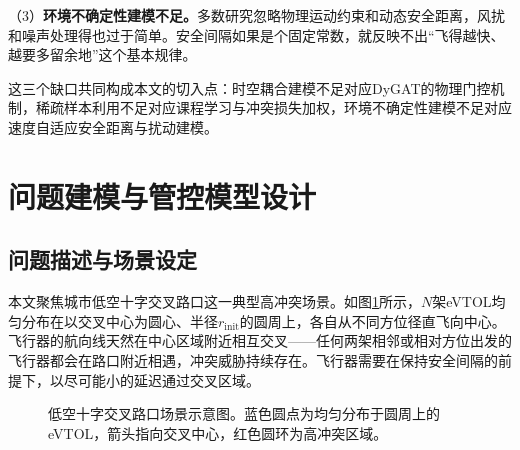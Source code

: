 \documentclass[12pt,a4paper,UTF8]{ctexart}
\begin{document}
（3）\textbf{环境不确定性建模不足。}多数研究忽略物理运动约束和动态安全距离\cite{ref11}，风扰和噪声处理得也过于简单。安全间隔如果是个固定常数，就反映不出“飞得越快、越要多留余地”这个基本规律。

这三个缺口共同构成本文的切入点：时空耦合建模不足对应DyGAT的物理门控机制，稀疏样本利用不足对应课程学习与冲突损失加权，环境不确定性建模不足对应速度自适应安全距离与扰动建模。

\section{问题建模与管控模型设计}

\subsection{问题描述与场景设定}

本文聚焦城市低空十字交叉路口这一典型高冲突场景。如图\ref{fig:scenario}所示，$N$架eVTOL均匀分布在以交叉中心为圆心、半径$r_{\text{init}}$的圆周上，各自从不同方位径直飞向中心。飞行器的航向线天然在中心区域附近相互交叉——任何两架相邻或相对方位出发的飞行器都会在路口附近相遇，冲突威胁持续存在。飞行器需要在保持安全间隔的前提下，以尽可能小的延迟通过交叉区域。

\begin{figure}[H]
    \centering
    \begin{minipage}[c]{0.7\textwidth}
    \centering
    \end{minipage}
    \caption{低空十字交叉路口场景示意图。蓝色圆点为均匀分布于圆周上的eVTOL，箭头指向交叉中心，红色圆环为高冲突区域。}
    \label{fig:scenario}
\end{figure}
\end{document}
